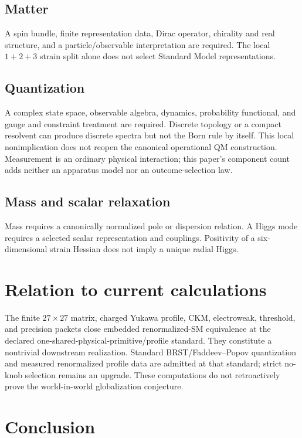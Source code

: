 \documentclass[11pt]{article}
\begin{document}
\subsection{Matter}
A spin bundle, finite representation data, Dirac operator, chirality and real
structure, and a particle/observable interpretation are required.  The local
$1+2+3$ strain split alone does not select Standard Model representations.

\subsection{Quantization}
A complex state space, observable algebra, dynamics, probability functional,
and gauge and constraint treatment are required.  Discrete topology or a compact
resolvent can produce discrete spectra but not the Born rule by itself.
This local nonimplication does not reopen the canonical operational QM
construction. Measurement is an ordinary physical interaction; this paper's
component count adds neither an apparatus model nor an outcome-selection law.

\subsection{Mass and scalar relaxation}
Mass requires a canonically normalized pole or dispersion relation.  A Higgs
mode requires a selected scalar representation and couplings.  Positivity of
a six-dimensional strain Hessian does not imply a unique radial Higgs.

\section{Relation to current calculations}

The finite $27\times27$ matrix, charged Yukawa profile, CKM, electroweak,
threshold, and precision packets close embedded renormalized-SM equivalence at
the declared one-shared-physical-primitive/profile standard.  They constitute
a nontrivial downstream realization.  Standard BRST/Faddeev--Popov
quantization and measured renormalized profile data are admitted at that
standard; strict no-knob selection remains an upgrade.  These computations do
not retroactively prove the world-in-world globalization conjecture.

\section{Conclusion}
\end{document}

